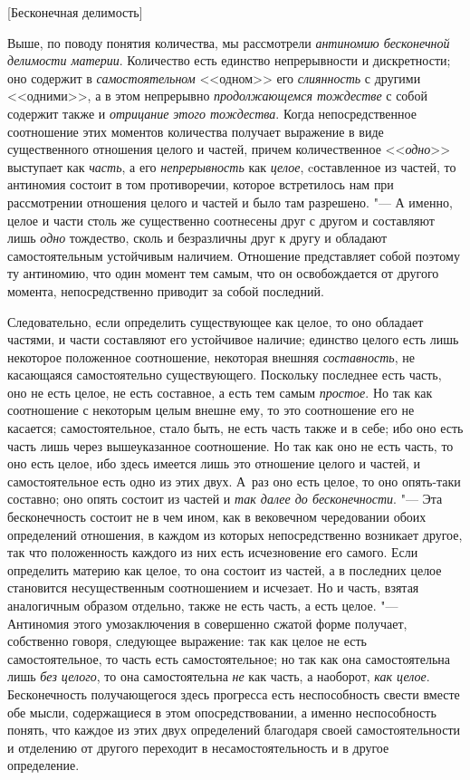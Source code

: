 %
  {[Бесконечная делимость]}

Выше, по поводу понятия количества, мы рассмотрели
{\em антиномию бесконечной делимости материи}.
Количество есть единство непрерывности и дискретности; оно содержит в
{\em самостоятельном} <<одном>> его
{\em слиянность} с другими <<одними>>, а в этом
непрерывно {\em продолжающемся тождестве} с собой
содержит также и {\em отрицание этого тождества}. Когда
непосредственное соотношение этих моментов количества получает выражение в
виде существенного отношения целого и частей, причем количественное
<<{\em одно}>> выступает как {\em часть}, а его
{\em непрерывность} как {\em целое}, cоставленное из частей, то антиномия
состоит в том противоречии, которое встретилось нам при рассмотрении
отношения целого и частей и было там разрешено. "--- А именно, целое и части
столь же существенно соотнесены друг с другом и составляют лишь
{\em одно} тождество, сколь и безразличны друг к другу
и обладают самостоятельным устойчивым наличием. Отношение представляет
собой поэтому ту антиномию, что один момент тем самым, что он освобождается
от другого момента, непосредственно приводит за собой последний.

Следовательно, если определить существующее как целое, то оно обладает
частями, и части составляют его устойчивое наличие; единство целого есть
лишь некоторое положенное соотношение, некоторая внешняя
{\em составность}, не касающаяся самостоятельно
существующего. Поскольку последнее есть часть, оно не есть целое, не есть
составное, а есть тем самым {\em простое}. Но так как
соотношение с некоторым целым внешне ему, то это соотношение его не
касается; самостоятельное, стало быть, не есть часть также и в себе; ибо
оно есть часть лишь через вышеуказанное соотношение. Но так как оно не есть
часть, то оно есть целое, ибо здесь имеется лишь это отношение целого и
частей, и самостоятельное есть одно из этих двух. А~раз оно есть целое,
то оно опять-таки составно; оно опять состоит из частей и
{\em так далее до бесконечности}. "--- Эта бесконечность
состоит не в чем ином, как в вековечном чередовании обоих определений
отношения, в каждом из которых непосредственно возникает другое, так что
положенность каждого из них есть исчезновение его самого. Если определить
материю как целое, то она состоит из частей, а в последних целое становится
несущественным соотношением и исчезает. Но и часть, взятая аналогичным
образом отдельно, также не есть часть, а есть целое. "--- Антиномия этого
умозаключения в совершенно сжатой форме получает, собственно говоря,
следующее выражение: так как целое не есть самостоятельное, то часть есть
самостоятельное; но так как она самостоятельна лишь
{\em без целого}, то она самостоятельна
{\em не} как часть, а наоборот,
{\em как целое}. Бесконечность получающегося здесь
прогресса есть неспособность свести вместе обе мысли, содержащиеся в этом
опосредствовании, а именно неспособность понять, что каждое из этих двух
определений благодаря своей самостоятельности и отделению от другого
переходит в несамостоятельность и в другое определение.


